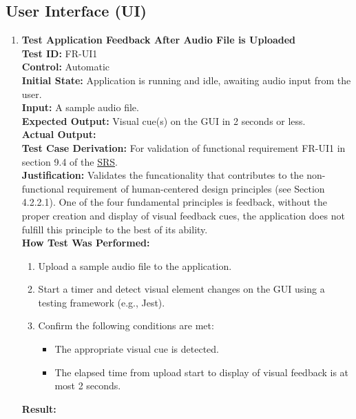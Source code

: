 \documentclass[12pt, titlepage]{article}
\begin{document}
  \subsection{User Interface (UI)}
  \begin{enumerate}
    \item \textbf{Test Application Feedback After Audio File is Uploaded} \\
      \newline
      \textbf{Test ID:} FR-UI1 \\
      \textbf{Control:} Automatic \\
      \textbf{Initial State:} Application is running and idle, awaiting audio input from the user. \\
      \textbf{Input:} A sample audio file. \\
      \textbf{Expected Output:} Visual cue(s) on the GUI in 2 seconds or less. \\
      \textbf{Actual Output:} \\
      \textbf{Test Case Derivation:} For validation of functional requirement FR-UI1 in section 9.4 of the 
      \href{https://github.com/emilyperica/ScoreGen/blob/main/docs/SRS-Volere/SRS.pdf}{SRS}. \\
      \textbf{Justification:} Validates the funcationality that contributes to the non-functional requirement of
      human-centered design principles (see Section 4.2.2.1). One of the four fundamental principles is feedback, without 
      the proper creation and display of visual feedback cues, the application does not fulfill this principle to the 
      best of its ability.\\
      \textbf{How Test Was Performed:}
      \begin{enumerate}
          \item Upload a sample audio file to the application.
          \item Start a timer and detect visual element changes on the GUI using a testing framework (e.g., Jest).
          \item Confirm the following conditions are met:
          \begin{itemize}
              \item The appropriate visual cue is detected.
              \item The elapsed time from upload start to display of visual feedback is at most 2 seconds.
          \end{itemize}
      \end{enumerate}
      \textbf{Result:}
    

\end{enumerate}
\end{document}
